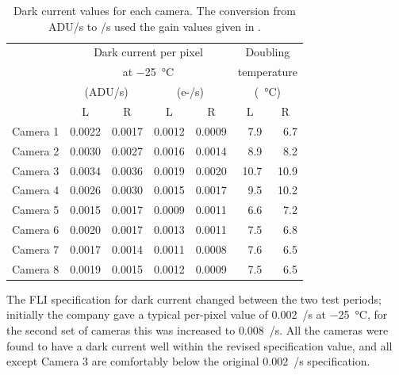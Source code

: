 \begin{colsection}
\begin{table}[t]
    \begin{center}
        \begin{tabular}{c|cc|cc|rr} %
             &
            \multicolumn{4}{c|}{Dark current per pixel} &
            \multicolumn{2}{c}{Doubling} \\
             &
            \multicolumn{4}{c|}{at \SI{-25}{\celsius}} &
            \multicolumn{2}{c}{temperature} \\
             &
            \multicolumn{2}{c|}{(ADU/s)} &
            \multicolumn{2}{c|}{(e-/s)} &
            \multicolumn{2}{c}{(\SI{}{\celsius})} \\
             & L & R & L & R &
             \multicolumn{1}{c}{L} & \multicolumn{1}{c}{R} \\
            \midrule
            Camera 1 & 0.0022 & 0.0017 & 0.0012 & 0.0009 &  7.9 &  6.7 \\
            Camera 2 & 0.0030 & 0.0027 & 0.0016 & 0.0014 &  8.9 &  8.2 \\
            Camera 3 & 0.0034 & 0.0036 & 0.0019 & 0.0020 & 10.7 & 10.9 \\
            Camera 4 & 0.0026 & 0.0030 & 0.0015 & 0.0017 &  9.5 & 10.2 \\
            Camera 5 & 0.0015 & 0.0017 & 0.0009 & 0.0011 &  6.6 &  7.2 \\
            Camera 6 & 0.0020 & 0.0017 & 0.0013 & 0.0011 &  7.5 &  6.8 \\
            Camera 7 & 0.0017 & 0.0014 & 0.0011 & 0.0008 &  7.6 &  6.5 \\
            Camera 8 & 0.0019 & 0.0015 & 0.0012 & 0.0009 &  7.5 &  6.5 \\
        \end{tabular}
    \end{center}
    \caption[Dark current values]{
        Dark current values for each camera. The conversion from ADU/s to \elec/s used the gain values given in .
    }\label{tab:dc}
\end{table}

The FLI specification for dark current changed between the two test periods; initially the company gave a typical per-pixel value of 0.002~\elec/s at \SI{-25}{\celsius}, for the second set of cameras this was increased to 0.008~\elec/s. All the cameras were found to have a dark current well within the revised specification value, and all except Camera 3 are comfortably below the original 0.002~\elec/s specification.


\end{colsection}
